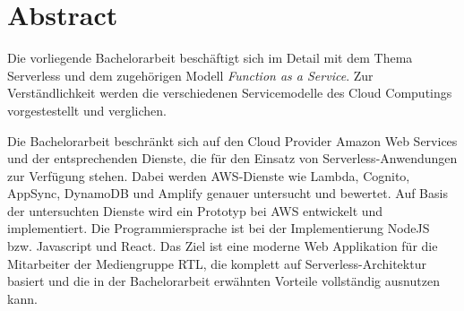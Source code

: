 
\section*{Abstract}

Die vorliegende Bachelorarbeit beschäftigt sich im Detail mit dem Thema Serverless und dem zugehörigen Modell \textsl{Function as a Service}.
Zur Verständlichkeit werden die verschiedenen Servicemodelle des Cloud Computings vorgestestellt und verglichen.

Die Bachelorarbeit beschränkt sich auf den Cloud Provider Amazon Web Services und der entsprechenden Dienste, die für den Einsatz von Serverless-Anwendungen zur Verfügung stehen.
Dabei werden AWS-Dienste wie Lambda, Cognito, AppSync, DynamoDB und Amplify genauer untersucht und bewertet.
Auf Basis der untersuchten Dienste wird ein Prototyp bei AWS entwickelt und implementiert. Die Programmiersprache ist bei der Implementierung NodeJS bzw. Javascript und React.
Das Ziel ist eine moderne Web Applikation für die Mitarbeiter der Mediengruppe RTL, die komplett auf Serverless-Architektur basiert
und die in der Bachelorarbeit erwähnten Vorteile vollständig ausnutzen kann.




\clearpage
